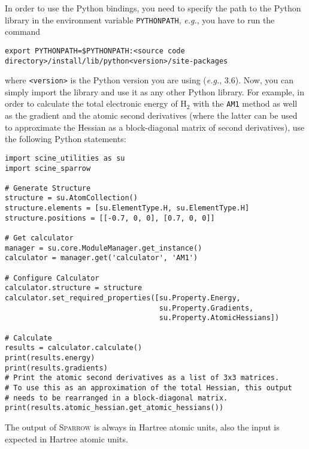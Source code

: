 \documentclass[]{tufte-book}
\begin{document}
In order to use the Python bindings, you need to specify the path to the Python library in the environment variable
\texttt{PYTHONPATH}, \textit{e.g.}, you have to run the command
\begin{verbatim}
export PYTHONPATH=$PYTHONPATH:<source code directory>/install/lib/python<version>/site-packages
\end{verbatim}
where \texttt{<version>} is the Python version you are using (\textit{e.g.}, 3.6). Now, you can simply import the library 
and use it as any other Python library. For example, in order to calculate the total electronic energy of H$_2$ with the 
\texttt{AM1} method as well as the gradient and the atomic second derivatives (where the latter can be used to approximate the Hessian as a block-diagonal matrix of second derivatives), use the following Python statements:
\begin{verbatim}
import scine_utilities as su
import scine_sparrow

# Generate Structure
structure = su.AtomCollection()
structure.elements = [su.ElementType.H, su.ElementType.H]
structure.positions = [[-0.7, 0, 0], [0.7, 0, 0]]

# Get calculator
manager = su.core.ModuleManager.get_instance()
calculator = manager.get('calculator', 'AM1')

# Configure Calculator
calculator.structure = structure
calculator.set_required_properties([su.Property.Energy,
                                    su.Property.Gradients, 
                                    su.Property.AtomicHessians])

# Calculate
results = calculator.calculate()
print(results.energy)
print(results.gradients)
# Print the atomic second derivatives as a list of 3x3 matrices.
# To use this as an approximation of the total Hessian, this output
# needs to be rearranged in a block-diagonal matrix.
print(results.atomic_hessian.get_atomic_hessians())
\end{verbatim}
The output of \textsc{Sparrow} is always in Hartree atomic units, also the input is expected in Hartree atomic units.
\end{document}
